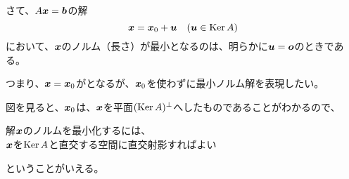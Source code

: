 \documentclass[../../../topic_linear-algebra]{subfiles}
\begin{document}
さて、$A\vb*{x} = \vb*{b}$の解
\begin{equation*}
  \vb*{x} = \vb*{x}_0 + \vb*{u} \quad (\vb*{u} \in \operatorname{Ker} A)
\end{equation*}
において、$\vb*{x}$のノルム（長さ）が最小となるのは、明らかに$\vb*{u} = \vb*{o}$のときである。

つまり、$\vb*{x} = \vb*{x}_0$がとなるが、$\vb*{x}_0$を使わずに最小ノルム解を表現したい。

\br

図を見ると、$\vb*{x}_0$は、$\vb*{x}$を平面$(\operatorname{Ker} A)^\perp$へしたものであることがわかるので、
\begin{emphabox}
  \begin{spacebox}
    \begin{center}
      解$\vb*{x}$のノルムを最小化するには、\\
      $\vb*{x}$を$\operatorname{Ker} A$と直交する空間に直交射影すればよい
    \end{center}
  \end{spacebox}
\end{emphabox}
ということがいえる。

\br

\todo{}
\end{document}
